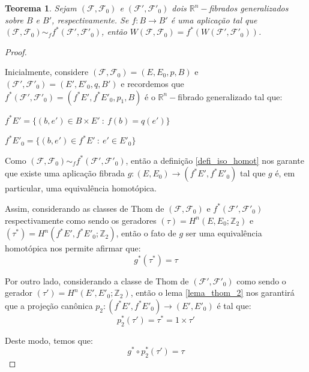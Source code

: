 \documentclass[12pt,oneside]{book} %
\newtheorem{teo}    {\hspace{0.5cm}Teorema}[chapter]
\newcommand{\R}{\mathbb{R}}
\newcommand{\Z}{\mathbb{Z}}
\begin{document}
\begin{teo}\label{res_SW_fht_2}
	Sejam $(\mathcal{F},\mathcal{F}_{0})$ e $(\mathcal{F'},\mathcal{F'}_{0})$ dois $\R^{n}-$fibrados generalizados sobre $B$ e $B'$, respectivamente. Se $f:B\to B'$ é uma aplicação tal que $(\mathcal{F},\mathcal{F}_{0})\sim_{f} f^{*}(\mathcal{F'},\mathcal{F'}_{0})$, então $W(\mathcal{F},\mathcal{F}_{0})=f^{*}(W(\mathcal{F'},\mathcal{F'}_{0}))$.
\end{teo}
\begin{proof}
	
	\
	
	\par Inicialmente, considere $(\mathcal{F},\mathcal{F}_{0})=(E,E_{0},p,B)$ e $(\mathcal{F'},\mathcal{F'}_{0})=(E',E'_{0},q,B')$ e recordemos que $f^{*}(\mathcal{F'},\mathcal{F'}_{0})=(f^{*}E',f^{*}E'_{0},p_{1},B)$ é o $\R^{n}-$fibrado generalizado tal que: \newline
	
	$f^{*}E'=\{ (b,e')\in B\times E' \ : \ f(b)=q(e') \}$
	
	$f^{*}E'_{0}=\{ (b,e')\in f^{*}E' \ : \ e'\in E'_{0} \}$ \newline
	
	\par Como $(\mathcal{F},\mathcal{F}_{0})\sim_{f} f^{*}(\mathcal{F'},\mathcal{F'}_{0})$, então a definição \ref{defi_iso_homot} nos garante que existe uma aplicação fibrada $g:(E,E_{0})\to (f^{*}E',f^{*}E'_{0})$ tal que $g$ é, em particular, uma equivalência homotópica.
	
	\par Assim, considerando as classes de Thom de $(\mathcal{F},\mathcal{F}_{0})$ e $f^{*}(\mathcal{F'},\mathcal{F'}_{0})$ respectivamente como sendo os geradores $(\tau)=H^{n}(E,E_{0};\Z_{2})$ e $(\tau^{*})=H^{n}(f^{*}E',f^{*}E'_{0};\Z_{2})$, então o fato de $g$ ser uma equivalência homotópica nos permite afirmar que:
	$$ g^{*}(\tau^{*})=\tau $$
	
	\par Por outro lado, considerando a classe de Thom de $(\mathcal{F'},\mathcal{F'}_{0})$ como sendo o gerador $(\tau')=H^{n}(E',E'_{0};\Z_{2})$, então o lema \ref{lema_thom_2} nos garantirá que a projeção canônica $p_{2}:(f^{*}E',f^{*}E'_{0})\to (E',E'_{0})$ é tal que:
	$$ p_{2}^{*}(\tau')=\tau^{*}=1\times \tau' $$
	
	\par Deste modo, temos que:
	$$ g^{*}\circ p_{2}^{*}(\tau')=\tau $$
	

\end{proof}
\end{document}
